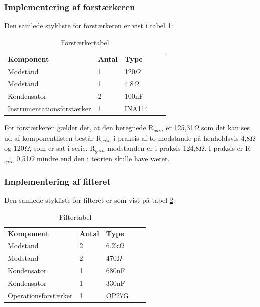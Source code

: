 \subsubsection{Implementering af forstærkeren}
Den samlede stykliste for forstærkeren er vist i tabel \ref{DForsttabel}:

\begin{table}[H]
\centering
\begin{tabular}{|l|l|l|ll}
\cline{1-3}
\textbf{Komponent} & \textbf{Antal} & \textbf{Type}  &  &  \\ \cline{1-3}
Modstand           & 1              & 120$\Omega$   &  &  \\ \cline{1-3}
Modstand           & 1              & 4.8$\Omega$   &  &  \\ \cline{1-3}
Kondensator        & 2              & 100nF         &  &  \\ \cline{1-3}
Instrumentationsforstærker &    1   & INA114		     &  &  \\ \cline{1-3}
\end{tabular}
\caption{Forstærkertabel}
\label{DForsttabel}
\end{table}

For forstærkeren gælder det, at den beregnede R$_{gain}$ er 125,31$\Omega$ som det kan ses ud af komponentlisten består R$_{gain}$ i praksis af to modstande på henholdsvis 4,8$\Omega$ og 120$\Omega$, som er sat i serie. R$_{gain}$ modstanden er i praksis 124,8$\Omega$. I praksis er R$_{gain}$ 0,51$\Omega$ mindre end den i teorien skulle have været.

\subsubsection{Implementering af filteret}
Den samlede stykliste for filteret er som vist på tabel \ref{DFiltertabel}:

\begin{table}[H]
\centering
\begin{tabular}{|l|l|l|ll}
\cline{1-3}
\textbf{Komponent} & \textbf{Antal} & \textbf{Type}  &  &  \\ \cline{1-3}
Modstand           & 2              & 6.2k$\Omega$ &  &  \\ \cline{1-3}
Modstand           & 2              & 470$\Omega$   &  &  \\ \cline{1-3}
Kondensator        & 1              & 680nF         &  &  \\ \cline{1-3}
Kondensator        & 1              & 330nF         &  &  \\ \cline{1-3}
Operationsforstærker &    1         & OP27G          &  &  \\ \cline{1-3}
\end{tabular}
\caption{Filtertabel}
\label{DFiltertabel}
\end{table}

